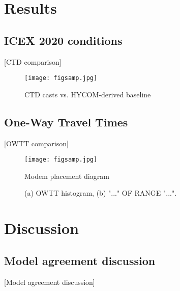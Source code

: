 \section{\label{sec:3} Results}

\subsection{\label{subsec:3:1} ICEX 2020 conditions}
{\color{red}[CTD comparison]}

\begin{figure}[ht]
\texttt{[image: figsamp.jpg]}
\caption{\label{fig:FIG2}{CTD casts vs. HYCOM-derived baseline}}
\end{figure}

\subsection{\label{subsec:3:2} One-Way Travel Times}
{\color{red}[OWTT comparison]}

\begin{figure}[ht]
\texttt{[image: figsamp.jpg]}
\caption{\label{fig:FIG3}{Modem placement diagram}}
\end{figure}

\begin{figure}[ht]
\caption{\label{fig:FIG4}{(a) OWTT histogram, (b) "..." OF RANGE "...".}}
\end{figure}



\section{\label{sec:4} Discussion}

\subsection{\label{subsec:4:1} Model agreement discussion}
{\color{red}[Model agreement discussion]}

